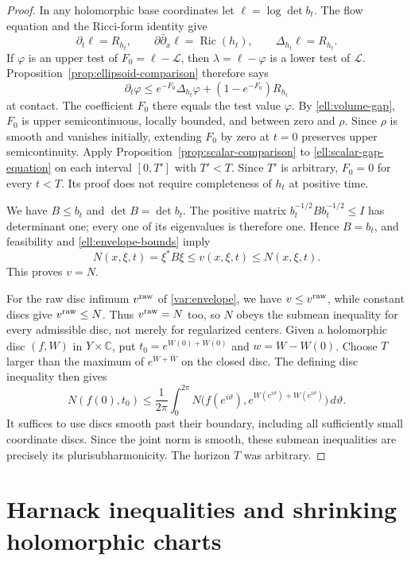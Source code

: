 \documentclass[11pt]{article}
\theoremstyle{definition}
\theoremstyle{remark}
\newcommand{\C}{\mathbb C}
\newcommand{\dd}{\partial\bar\partial}
\DeclareMathOperator{\Ric}{Ric}
\numberwithin{equation}{section}
\begin{document}
\begin{proof}
In any holomorphic base coordinates let $\ell=\log\det b_t$.
The flow equation and the Ricci-form identity give
\[
 \partial_t\ell=R_{h_t},\qquad
 \dd_x\ell=\Ric(h_t),\qquad
 \Delta_{h_t}\ell=R_{h_t}.
\]
If $\varphi$ is an upper test of $F_0=\ell-\mathcal L$, then
$\lambda=\ell-\varphi$ is a lower test of $\mathcal L$.
Proposition~\ref{prop:ellipsoid-comparison} therefore says
\begin{equation}\label{ell:scalar-gap-equation}
 \partial_t\varphi
 \le e^{-F_0}\Delta_{h_t}\varphi
          +(1-e^{-F_0})R_{h_t}
\end{equation}
at contact.  The coefficient $F_0$ there equals the test value
$\varphi$.  By \eqref{ell:volume-gap}, $F_0$ is upper semicontinuous,
locally bounded, and between zero and $\rho$.  Since $\rho$ is smooth
and vanishes initially, extending $F_0$ by zero at $t=0$ preserves
upper semicontinuity.  Apply Proposition~\ref{prop:scalar-comparison}
to \eqref{ell:scalar-gap-equation} on each interval $[0,T']$ with
$T'<T$.  Since $T'$ is arbitrary, $F_0=0$ for every $t<T$.
Its proof does not require completeness of $h_t$ at positive time.

We have $B\le b_t$ and $\det B=\det b_t$.  The positive matrix
$b_t^{-1/2}Bb_t^{-1/2}\le I$ has determinant one; every one of its
eigenvalues is therefore one.  Hence $B=b_t$, and feasibility and
\eqref{ell:envelope-bounds} imply
\[
 N(x,\xi,t)=\xi^*B\xi\le v(x,\xi,t)\le N(x,\xi,t).
\]
This proves $v=N$.

For the raw disc infimum $v^{\rm raw}$ of \eqref{var:envelope},
we have $v\le v^{\rm raw}$, while constant discs give $v^{\rm raw}\le N$.
Thus $v^{\rm raw}=N$ too, so $N$ obeys the submean inequality for
every admissible disc, not merely for regularized centers.
Given a holomorphic disc $(f,W)$ in $Y\times\C$, put
$t_0=e^{W(0)+\overline{W(0)}}$ and $w=W-W(0)$.
Choose $T$ larger than the maximum of $e^{W+\bar W}$ on the closed
disc.  The defining disc inequality then gives
\[
 N(f(0),t_0)
 \le\frac1{2\pi}\int_0^{2\pi}
 N\bigl(f(e^{i\vartheta}),e^{W(e^{i\vartheta})+
                  \overline{W(e^{i\vartheta})}}\bigr)\,d\vartheta.
\]
It suffices to use discs smooth past their boundary, including all
sufficiently small coordinate discs.  Since the joint norm is smooth,
these submean inequalities are precisely its plurisubharmonicity.
The horizon $T$ was arbitrary.
\end{proof}

\section{Harnack inequalities and shrinking holomorphic charts}
\label{sec:charts}
\end{document}
